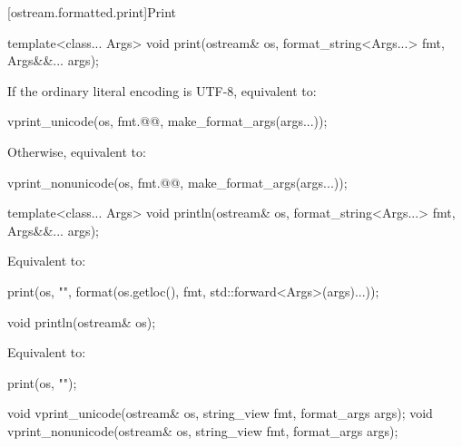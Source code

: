 [ostream.formatted.print]{Print}

%
\begin{itemdecl}
template<class... Args>
  void print(ostream& os, format_string<Args...> fmt, Args&&... args);
\end{itemdecl}

\begin{itemdescr}
\pnum
\effects
If the ordinary literal encoding is UTF-8, equivalent to:
\begin{codeblock}
vprint_unicode(os, fmt.@@, make_format_args(args...));
\end{codeblock}
Otherwise, equivalent to:
\begin{codeblock}
vprint_nonunicode(os, fmt.@@, make_format_args(args...));
\end{codeblock}
\end{itemdescr}

%
\begin{itemdecl}
template<class... Args>
  void println(ostream& os, format_string<Args...> fmt, Args&&... args);
\end{itemdecl}

\begin{itemdescr}
\pnum
\effects
Equivalent to:
\begin{codeblock}
print(os, "{}\n", format(os.getloc(), fmt, std::forward<Args>(args)...));
\end{codeblock}
\end{itemdescr}

%
\begin{itemdecl}
void println(ostream& os);
\end{itemdecl}

\begin{itemdescr}
\pnum
\effects
Equivalent to:
\begin{codeblock}
print(os, "\n");
\end{codeblock}
\end{itemdescr}

%
%
\begin{itemdecl}
void vprint_unicode(ostream& os, string_view fmt, format_args args);
void vprint_nonunicode(ostream& os, string_view fmt, format_args args);
\end{itemdecl}

